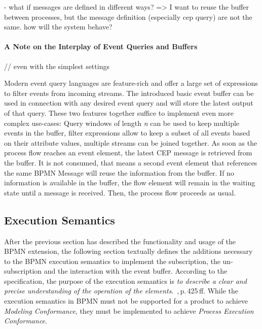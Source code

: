 - what if messages are defined in different ways? => I want to reuse the buffer between processes, but the message definition (especially cep query) are not the same. how will the system behave?

\paragraph{A Note on the Interplay of Event Queries and Buffers}

// even with the simplest settings

Modern event query languages are feature-rich and offer a large set of expressions to filter events from incoming streams. 
The introduced basic event buffer can be used in connection with any desired event query and will store the latest output of that query.
These two features together suffice to implement even more complex use-cases: Query windows of length \textit{n} can be used to keep multiple events in the buffer, filter expressions allow to keep a subset of all events based on their attribute values, multiple streams can be joined together.
As soon as the process flow reaches an event element, the latest CEP message is retrieved from the buffer. It is not consumed, that means a second event element that references the same BPMN Message will reuse the information from the buffer.
If no information is available in the buffer, the flow element will remain in the waiting state until a message is received. Then, the process flow proceeds as usual.

\subsection{Execution Semantics}

After the previous section has described the functionality and usage of the BPMN extension, the following section textually defines the additions necessary to the BPMN execution semantics to implement the subscription, the un-subscription and the interaction with the event buffer.
According to the specification, the purpose of the execution semantics is \textit{to describe a clear and precise understanding of the operation of the elements}.~\cite{bpmnspec},\,p.\,425\,ff.
While the execution semantics in BPMN must not be supported for a product to achieve \textit{Modeling Conformance}, they must be implemented to achieve \textit{Process Execution Conformance}.

